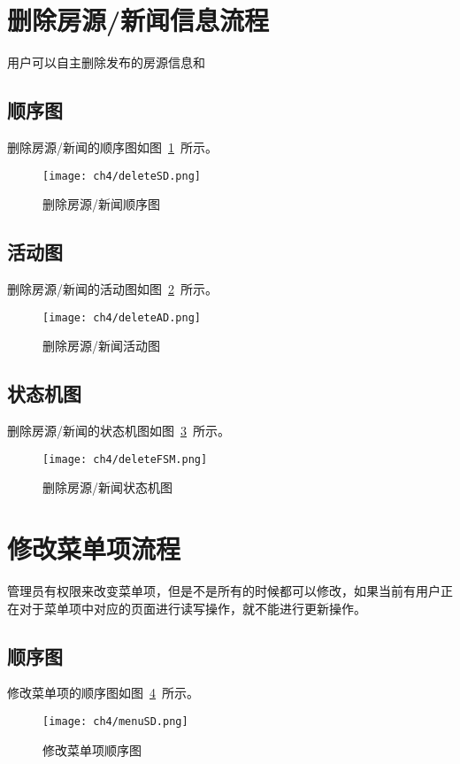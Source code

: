 \section{删除房源/新闻信息流程}
用户可以自主删除发布的房源信息和
\subsection{顺序图}
删除房源/新闻的顺序图如图~\ref{fig:deleteSD}~所示。
\begin{figure}[htbp]
    \centering
    \texttt{[image: ch4/deleteSD.png]}
    \caption{删除房源/新闻顺序图}\label{fig:deleteSD}
    \vspace{\baselineskip} %
\end{figure}
\subsection{活动图}
删除房源/新闻的活动图如图~\ref{fig:deleteAD}~所示。
\begin{figure}[htbp]
    \centering
    \texttt{[image: ch4/deleteAD.png]}
    \caption{删除房源/新闻活动图}\label{fig:deleteAD}
    \vspace{\baselineskip} %
\end{figure}
\subsection{状态机图}
删除房源/新闻的状态机图如图~\ref{fig:deleteFSM}~所示。
\begin{figure}[htbp]
    \centering
    \texttt{[image: ch4/deleteFSM.png]}
    \caption{删除房源/新闻状态机图}\label{fig:deleteFSM}
    \vspace{\baselineskip} %
\end{figure}

\section{修改菜单项流程}
管理员有权限来改变菜单项，但是不是所有的时候都可以修改，如果当前有用户正在对于菜单项中对应的页面进行读写操作，就不能进行更新操作。
\subsection{顺序图}
修改菜单项的顺序图如图~\ref{fig:menuSD}~所示。
\begin{figure}[htbp]
    \centering
    \texttt{[image: ch4/menuSD.png]}
    \caption{修改菜单项顺序图}\label{fig:menuSD}
    \vspace{\baselineskip} %
\end{figure}
